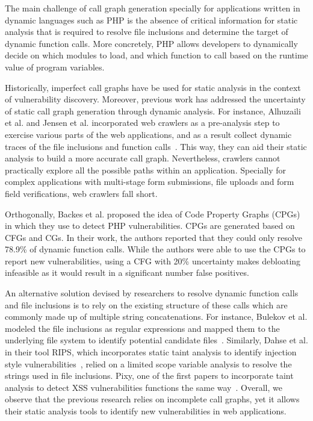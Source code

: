 The main challenge of call graph generation specially for applications written in dynamic languages such as PHP is the absence of critical information for static analysis that is required to resolve file inclusions and determine the target of dynamic function calls. 
More concretely, PHP allows developers to dynamically decide on which modules to load, and which function to call based on the runtime value of program variables. 

Historically, imperfect call graphs have be used for static analysis in the context of vulnerability discovery. 
Moreover, previous work has addressed the uncertainty of static call graph generation through dynamic analysis. 
For instance, Alhuzaili et al. and Jensen et al. incorporated web crawlers as a pre-analysis step to exercise various parts of the web applications, and as a result collect dynamic traces of the file inclusions and function calls~\cite{alhuzali2018navex, jensen2012thaps}. 
This way, they can aid their static analysis to build a more accurate call graph. 
Nevertheless, crawlers cannot practically explore all the possible paths within an application. 
Specially for complex applications with multi-stage form submissions, file uploads and form field verifications, web crawlers fall short. 

Orthogonally, Backes et al. proposed the idea of Code Property Graphs (CPGs) in which they use to detect PHP vulnerabilities. 
CPGs are generated based on CFGs and CGs. 
In their work, the authors reported that they could only resolve 78.9\% of dynamic function calls. 
While the authors were able to use the CPGs to report new vulnerabilities, using a CFG with 20\% uncertainty makes debloating infeasible as it would result in a significant number false positives. 

An alternative solution devised by researchers to resolve dynamic function calls and file inclusions is to rely on the existing structure of these calls which are commonly made up of multiple string concatenations. 
For instance, Bulekov et al. modeled the file inclusions as regular expressions and mapped them to the underlying file system to identify potential candidate files~\cite{saphire}. 
Similarly, Dahse et al. in their tool RIPS, which incorporates static taint analysis to identify injection style vulnerabilities~\cite{dahse2010rips}, relied on a limited scope variable analysis to resolve the strings used in file inclusions. 
Pixy, one of the first papers to incorporate taint analysis to detect XSS vulnerabilities functions the same way~\cite{jovanovic2006pixy}. 
Overall, we observe that the previous research relies on incomplete call graphs, yet it allows their static analysis tools to identify new vulnerabilities in web applications.

